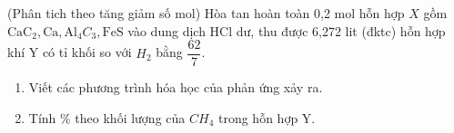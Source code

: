\begin{vd} (Phân tich theo tăng giảm số mol)
	Hòa tan hoàn toàn 0,2 mol hỗn hợp $X$ gồm $\mathrm{CaC}_2, \mathrm{Ca}, \mathrm{Al}_4 C_3, \mathrm{FeS}$ vào dung dịch $\mathrm{HCl}$ dư, thu được 6,272 lit (đktc) hỗn hợp khí Y có tỉ khối so với $H_2$ bằng $\dfrac{62}{7}$.
	\begin{enumerate}
		\item Viết các phương trình hóa học của phản ứng xảy ra.
		\item Tính \% theo khối lượng của $CH_4$ trong hỗn hợp Y.
	\end{enumerate}
	\loigiai{
	}
\end{vd}

